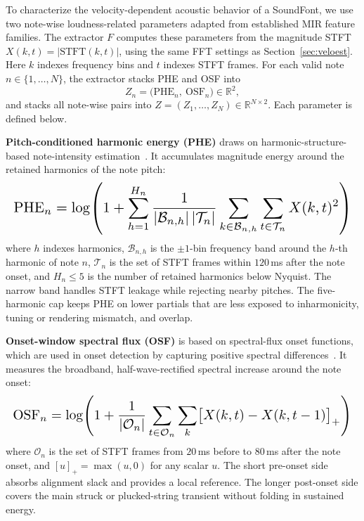 \documentclass{article}
\begin{document}
To characterize the velocity-dependent acoustic behavior of a SoundFont, we use two note-wise loudness-related parameters adapted from established MIR feature families. The extractor $F$ computes these parameters from the magnitude STFT
$X(k,t)=|\mathrm{STFT}(k,t)|$, using the same FFT settings as Section~\ref{sec:veloest}. Here $k$ indexes frequency bins and $t$ indexes STFT frames. For each valid note $n\in\{1,\ldots,N\}$, the extractor stacks PHE and OSF into
\begin{equation}
\label{eq:Z_def}
Z_n = \bigl(\mathrm{PHE}_n,\ \mathrm{OSF}_n\bigr) \in \mathbb{R}^2,
\end{equation}
and stacks all note-wise pairs into $Z = (Z_1,\ldots,Z_N) \in \mathbb{R}^{N\times 2}$. Each parameter is defined below.
 
\textbf{Pitch-conditioned harmonic energy (PHE)} draws on harmonic-structure-based note-intensity estimation~\cite{ewert2011estimating}. It accumulates magnitude energy around the retained harmonics of the note pitch:
\begin{equation}
\label{eq:harmonic_energy}
\resizebox{\columnwidth}{!}{$
\displaystyle
\mathrm{PHE}_n =
\log\!\left(1 + \sum_{h=1}^{H_n}
\frac{1}{|\mathcal{B}_{n,h}|\,|\mathcal{T}_n|}
\sum_{k \in \mathcal{B}_{n,h}} \sum_{t \in \mathcal{T}_n} X(k,t)^2 \right)
$}
\end{equation}
where $h$ indexes harmonics, $\mathcal{B}_{n,h}$ is the $\pm1$-bin frequency band around the $h$-th harmonic of note $n$, $\mathcal{T}_n$ is the set of STFT frames within $120$\,ms after the note onset, and $H_n\le5$ is the number of retained harmonics below Nyquist. The narrow band handles STFT leakage while rejecting nearby pitches. The five-harmonic cap keeps PHE on lower partials that are less exposed to inharmonicity, tuning or rendering mismatch, and overlap.
 
\textbf{Onset-window spectral flux (OSF)} is based on spectral-flux onset functions, which are used in onset detection by capturing positive spectral differences~\cite{dixon2006onset,boeck2013maximum}. It measures the broadband, half-wave-rectified spectral increase around the note onset:
\begin{equation}
\label{eq:onset_flux}
\resizebox{\columnwidth}{!}{$
\displaystyle
\mathrm{OSF}_n =
\log\!\left(1 + \frac{1}{|\mathcal{O}_n|}
\sum_{t \in \mathcal{O}_n} \sum_k \bigl[ X(k,t) - X(k,t-1) \bigr]_+ \right)
$}
\end{equation}
where $\mathcal{O}_n$ is the set of STFT frames from $20$\,ms before to $80$\,ms after the note onset, and $[u]_+ = \max(u,0)$ for any scalar $u$. The short pre-onset side absorbs alignment slack and provides a local reference. The longer post-onset side covers the main struck or plucked-string transient without folding in sustained energy.
 
\end{document}
